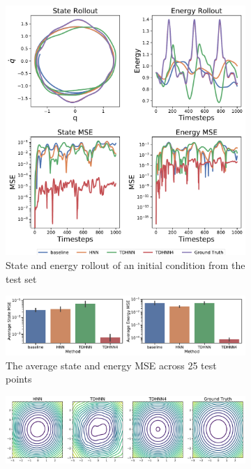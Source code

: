\documentclass[twoside]{article}
\begin{document}
\begin{figure}[!htb]
\centering
\captionsetup{justification=centering}
\begin{subfigure}[b]{0.48\textwidth}
\includegraphics[width=\textwidth]{figures/figures/forced_mass_spring/2/forced_mass_spring_long_0.pdf}
\caption{State and energy rollout of an initial condition from the test set}
\end{subfigure}
\begin{subfigure}[b]{0.48\textwidth}
\includegraphics[width=\textwidth]{figures/figures/forced_mass_spring/2/forced_mass_spring_errors_0.pdf}
\caption{The average state and energy MSE across 25 test points}
\end{subfigure}
\begin{subfigure}[b]{0.48\textwidth}
\includegraphics[width=\textwidth]{figures/figures/forced_mass_spring/2/forced_mass_spring_hamiltonian_0.pdf}

\end{subfigure}
\end{figure}
\end{document}
